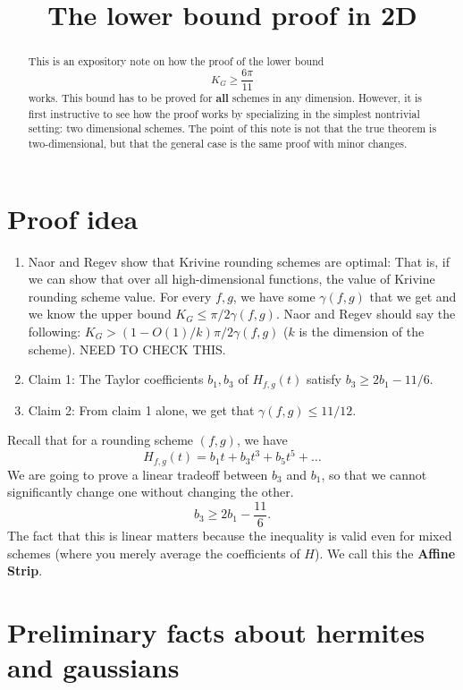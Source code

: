 \documentclass[11pt]{article}
\title{The lower bound proof in 2D}
\author{}
\begin{document}
\maketitle

\begin{abstract}
\noindent This is an expository note on how the proof of the lower bound
\[
        K_G\ge \frac{6\pi}{11}
\]
works. This bound has to be proved for \textbf{all} schemes in any dimension. However, it is first instructive to see how the proof works by specializing in the simplest nontrivial setting: two dimensional schemes.  The point of this note is not that the true theorem is two-dimensional, but that the general case is the same proof with minor changes. 
\end{abstract}

\tableofcontents

\section*{Proof idea}

\begin{enumerate}
    \item Naor and Regev show that Krivine rounding schemes are optimal: That is, if we can show that over all high-dimensional functions, the value of Krivine rounding scheme value.  For every $f,g$, we have some $\gamma(f,g)$ that we get and we know the upper bound $K_G \leq \pi/2\gamma(f,g)$. Naor and Regev should say the following: $K_G > (1-O(1)/k) \pi/2\gamma(f,g)$ ($k$ is the dimension of the scheme). NEED TO CHECK THIS. 
    \item Claim 1: The Taylor coefficients $b_1, b_3$ of $H_{f,g}(t)$ satisfy $b_3 \geq 2 b_1 - 11/6$. 
    \item Claim 2: From claim 1 alone, we get that $\gamma(f,g) \leq 11/12$. 
\end{enumerate}

 Recall that for a rounding scheme $(f, g)$, we have \[H_{f,g}(t) = b_1 t + b_3 t^3 + b_5 t^5 + \ldots\]
We are going to prove a linear tradeoff between $b_3$ and $b_1$, so that we cannot significantly change one without changing the other. 
\[
        b_3 \ge 2b_1 -\frac{11}{6}.
\]
The fact that this is linear matters because the inequality is valid even for mixed schemes (where you merely average the coefficients of $H$). We call this the \textbf{Affine Strip}. 

\section{Preliminary facts about hermites and gaussians}
\end{document}
